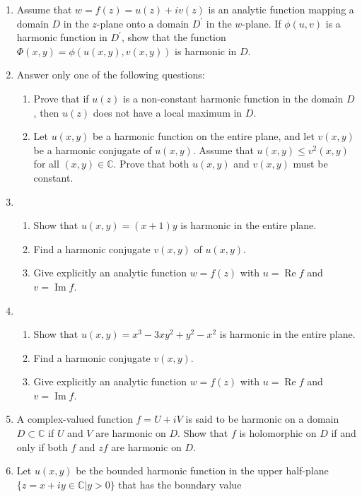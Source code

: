 \documentclass[a4paper,10pt]{article}
\renewcommand{\Re}{\operatorname{Re}}
\renewcommand{\Im}{\operatorname{Im}}
\begin{document}
\begin{enumerate}
			\item Assume that $w=f(z)=u(z)+iv(z)$ is an analytic function mapping a domain $D$ in the $z$-plane onto a domain $D^{\prime}$ in the $w$-plane.
	If $\phi(u,v)$ is a harmonic function in $D^{\prime}$, show that the function $\Phi(x,y)=\phi(u(x,y),v(x,y))$ is harmonic in $D$.
	
	\item Answer only one of the following questions:
	
	\begin{enumerate} 
		\item Prove that if $u(z)$ is a non-constant harmonic function in the domain $D$, then $u(z)$ does not have a local maximum in $D$.
		
		\item Let $u(x,y)$ be a harmonic function on the entire plane, and let $v(x,y)$ be a harmonic conjugate of $u(x,y)$.
		Assume that $u(x,y)\le v^{2}(x,y)$ for all $(x,y)\in \mathbb{C}$. Prove that both $u(x,y)$ and $v(x,y)$ must be constant.
	\end{enumerate}
	
	\item 
	\begin{enumerate}
		\item  Show that $u(x,y)=(x+1)y$ is harmonic in the entire plane.
		\item  Find a harmonic conjugate $v(x,y)$ of $u(x,y)$.
		\item Give explicitly an analytic function $w=f(z)$ with $u=\Re f$ and $v=\Im f$.
	\end{enumerate}
	
	
	\item 
	\begin{enumerate}
		\item Show that $u(x,y)=x^{3}-3xy^{2}+y^{2}-x^{2}$ is harmonic in the entire plane.
		\item Find a harmonic conjugate $v(x,y)$.
		\item Give explicitly an analytic function $w=f(z)$ with $u=\Re f$ and $v=\Im f$.
	\end{enumerate}
	
	\item  A complex-valued function $f=U+iV$ is said to be harmonic on a domain $D\subset\mathbb{C}$ if $U$ and $V$ are harmonic on $D$. Show that $f$ is holomorphic on $D$ if and only if both $f$ and $zf$ are harmonic on $D$.
	
	\item  Let $u(x,y)$ be the bounded harmonic function in the upper half-plane $\{z=x+iy\in \mathbb{C}|y>0\}$ that has the boundary value
	

\end{enumerate}
\end{document}
